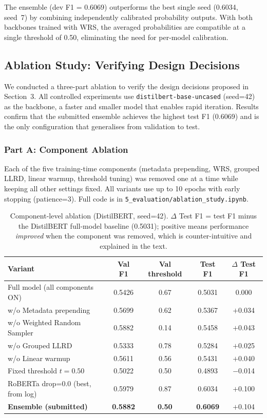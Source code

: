 \documentclass[11pt]{article}
\begin{document}
The ensemble (dev F1 = 0.6069) outperforms the best single seed (0.6034, seed~7) by combining independently calibrated probability outputs. With both backbones trained with WRS, the averaged probabilities are compatible at a single threshold of 0.50, eliminating the need for per-model calibration.

\clearpage
\subsection{Ablation Study: Verifying Design Decisions}
\label{sec:ablation}

We conducted a three-part ablation to verify the design decisions proposed in Section~3. All controlled experiments use \texttt{distilbert-base-uncased} (seed=42) as the backbone, a faster and smaller model that enables rapid iteration. Results confirm that the submitted ensemble achieves the highest test F1 (0.6069) and is the only configuration that generalises from validation to test.

\subsubsection*{Part A: Component Ablation}

Each of the five training-time components (metadata prepending, WRS, grouped LLRD, linear warmup, threshold tuning) was removed one at a time while keeping all other settings fixed. All variants use up to 10 epochs with early stopping (patience=3). Full code is in \texttt{5\_evaluation/ablation\_study.ipynb}.

\begin{table}[H]
\centering
\begin{tabular}{lcccc}
\toprule
Variant & Val F1 & Val threshold & Test F1 & $\Delta$ Test F1 \\
\midrule
Full model (all components ON) & 0.5426 & 0.67 & 0.5031 & 0.000 \\
w/o Metadata prepending        & 0.5699 & 0.62 & 0.5367 & $+$0.034 \\
w/o Weighted Random Sampler    & 0.5882 & 0.14 & 0.5458 & $+$0.043 \\
w/o Grouped LLRD               & 0.5333 & 0.78 & 0.5284 & $+$0.025 \\
w/o Linear warmup              & 0.5611 & 0.56 & 0.5431 & $+$0.040 \\
Fixed threshold $t=0.50$       & 0.5022 & 0.50 & 0.4893 & $-$0.014 \\
\midrule
RoBERTa drop=0.0 (best, from log) & 0.5979 & 0.87 & 0.6034 & $+$0.100 \\
\textbf{Ensemble (submitted)}     & \textbf{0.5882} & \textbf{0.50} & \textbf{0.6069} & $+$0.104 \\
\bottomrule
\end{tabular}
\caption{Component-level ablation (DistilBERT, seed=42). $\Delta$ Test F1 = test F1 minus the DistilBERT full-model baseline (0.5031); positive means performance \emph{improved} when the component was removed, which is counter-intuitive and explained in the text.}
\label{tab:ablation_component}
\end{table}
\end{document}

